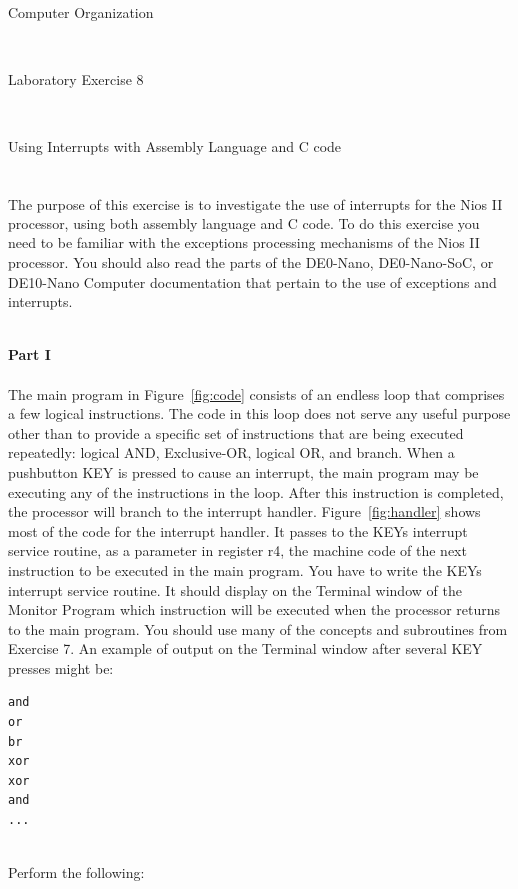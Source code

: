 \documentclass[epsfig,10pt,fullpage]{article}
\newcommand{\LabNum}{8}
\begin{document}
\centerline{\huge Computer Organization}
~\\
\centerline{\huge Laboratory Exercise \LabNum}
~\\
\centerline{\large Using Interrupts with Assembly Language and C code}
~\\

\noindent
The purpose of this exercise is to investigate the use of interrupts for the Nios\textsuperscript{\textregistered} II
processor, using both assembly language and C code. To do this exercise you need to be familiar 
with the exceptions processing mechanisms of the Nios II processor.
You should also read the parts of the DE0-Nano, DE0-Nano-SoC, or DE10-Nano Computer documentation that pertain 
to the use of exceptions and interrupts.

~\\
\noindent
{\bf Part I}
~\\\\
\noindent
The main program in Figure~\ref{fig:code} consists of an endless loop that comprises 
a few logical instructions. The code in this loop does not serve any useful purpose other 
than to provide a specific set of instructions that are being executed repeatedly: logical
AND, Exclusive-OR, logical OR, and branch. When a pushbutton KEY is pressed to cause an 
interrupt, the main program may be executing any of the instructions in the loop. After 
this instruction is completed, the processor will branch to the interrupt handler. 
Figure~\ref{fig:handler} shows most of the code for the interrupt handler. It passes to 
the KEYs interrupt service routine, as a parameter in register r4, the machine code 
of the next instruction to be executed in the main program. You have to write the KEYs interrupt 
service routine. It should display on the Terminal window of the Monitor Program which 
instruction will be executed when the processor returns to the main program. 
You should use many of the concepts and subroutines from Exercise 7.
An example of output on the Terminal window after several KEY presses might be:

\begin{minipage}[t]{12.5 cm}
\begin{lstlisting}
and
or
br
xor
xor
and
...
\end{lstlisting}
\end{minipage}

~\\
\noindent
Perform the following:
\end{document}
